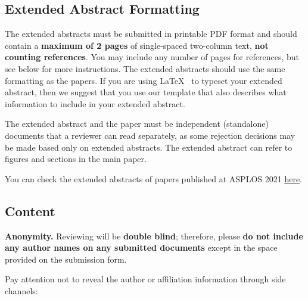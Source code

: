 \documentclass[pageno]{jpaper}
\begin{document}
\subsection{Extended Abstract Formatting}

The extended abstracts must be submitted in printable PDF format and should contain a
{\bf maximum of 2 pages} of single-spaced two-column text, {\bf not
  counting references}.  You may include any number of pages for
references, but see below for more instructions. The extended
abstracts should use the same formatting as the papers. If you are using
\LaTeX~\cite{lamport94} to typeset your extended abstract, then we suggest that
you use
our
  template that also describes what information to include in your
extended abstract. 

The extended abstract and the paper must be independent (standalone) documents that a reviewer can read separately, as some rejection decisions may be made based only on extended abstracts. The extended abstract can refer to figures and sections in the main paper.

You can check the extended abstracts of papers published at ASPLOS 2021 
\href{https://asplos-conference.org/2021/index.html%3Fp=2181.html}
{here}.

\subsection{Content}

\noindent\textbf{Anonymity.}  Reviewing will be \textbf{double blind};
therefore, please \textbf{do not include any author names on any submitted
documents} except in the space provided on the submission form.  

Pay attention not to reveal the author or affiliation information through
side channels:
\end{document}
